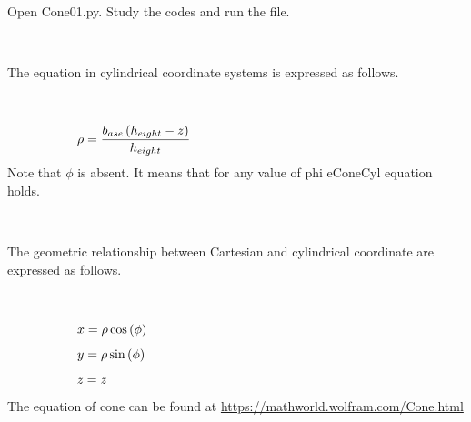 \documentclass[10pt,a4paper,leqno]{article}
\begin{document}
\begin{CJK*}{UTF8}{gbsn}
\noindent Open Cone01.py. Study the codes and run the file.
 \par \ \par\noindent The equation in cylindrical coordinate systems is expressed as follows.
 \par \ \par\begin{equation}
 \begin{minipage}{250pt}
                \begin{flushleft} $\displaystyle \rho = \frac{b_{ase} \left(h_{eight} - z\right)}{h_{eight}}$  \end{flushleft}
 \end{minipage}
 \end{equation}
\noindent Note that $\phi$ is absent. It means that for any value of phi eConeCyl equation holds.
 \par \ \par\noindent The geometric relationship between Cartesian and cylindrical coordinate are expressed as follows.
 \par \ \par\begin{equation}
 \begin{minipage}{250pt}
                \begin{flushleft} $\displaystyle x = \rho \cos{\left(\phi \right)}$  \end{flushleft}
 \end{minipage}
 \end{equation}
\begin{equation}
 \begin{minipage}{250pt}
                \begin{flushleft} $\displaystyle y = \rho \sin{\left(\phi \right)}$  \end{flushleft}
 \end{minipage}
 \end{equation}
\begin{equation}
 \begin{minipage}{250pt}
                \begin{flushleft} $\displaystyle z = z$  \end{flushleft}
 \end{minipage}
 \end{equation}
\noindent The equation of cone can be found at \url{https://mathworld.wolfram.com/Cone.html} 
 \par \ \par\begin{equation}

\end{equation}
\end{CJK*}
\end{document}
